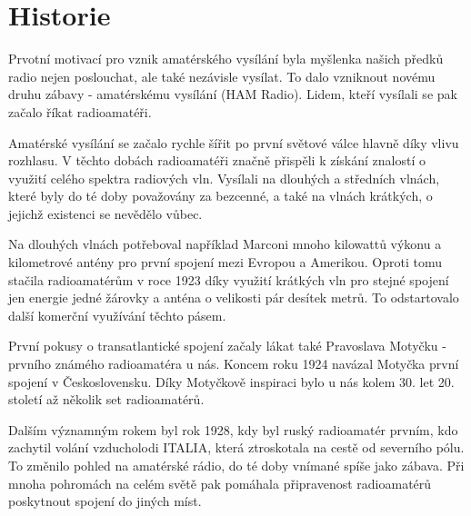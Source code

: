 \section{Historie}
\label{radioamateri_hist}
Prvotní motivací pro vznik amatérského vysílání %
byla myšlenka našich předků radio %
nejen poslouchat, ale také nezávisle vysílat.
To dalo vzniknout novému druhu zábavy - amatérskému vysílání (HAM Radio). Lidem, kteří vysílali se pak začalo říkat 
radioamatéři.

Amatérské vysílání se začalo rychle šířit po první světové válce hlavně díky vlivu
rozhlasu. %
V těchto dobách radioamatéři značně
přispěli k získání znalostí o využití celého spektra radiových vln. Vysílali na dlouhých a středních vlnách, které byly do té doby
považovány za bezcenné, a také na vlnách krátkých, o jejichž existenci se nevědělo vůbec.

Na dlouhých vlnách potřeboval například Marconi mnoho kilowattů výkonu a kilometrové antény pro první spojení
mezi Evropou a Amerikou. Oproti tomu stačila radioamatérům v roce 1923 díky využití krátkých vln
pro stejné spojení jen energie jedné žárovky a anténa o velikosti pár desítek
metrů. To odstartovalo další komerční
využívání těchto pásem.

První pokusy o transatlantické spojení začaly lákat také Pravoslava Motyčku - prvního známého radioamatéra u nás.
Koncem roku 1924 navázal Motyčka první spojení v Československu. 
Díky Motyčkově inspiraci bylo u nás kolem 30. let 20. století až několik set radioamatérů.

Dalším významným rokem byl rok 1928, kdy byl ruský radioamatér prvním, kdo zachytil volání vzducholodi ITALIA,
která ztroskotala na cestě od severního pólu. To změnilo pohled na amatérské
rádio, do té doby vnímané spíše jako zábava. Při mnoha pohromách na celém světě
pak pomáhala připravenost radioamatérů poskytnout spojení do
jiných míst.

